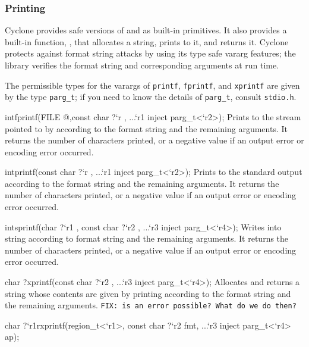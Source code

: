 \subsubsection*{Printing}

Cyclone provides safe versions of  and  as
built-in primitives.  It also provides a built-in function,
, that allocates a string, prints to it, and returns it.
Cyclone protects against format string attacks by using its type safe
vararg features; the library verifies the format string and
corresponding arguments at run time.

The permissible types for the varargs of \texttt{printf},
\texttt{fprintf}, and \texttt{xprintf} are given by the type
\texttt{parg_t}; if you need to know the details of \texttt{parg_t},
consult \texttt{stdio.h}.

\begin{defun2}{int}{fprintf}{(FILE @,const char {?}`r , ...`r1 inject parg_t<`r2>);}
  Prints to the stream pointed to by  according to the format
  string  and the remaining arguments.  It returns the number
  of characters printed, or a negative value if an output error or
  encoding error occurred.
\end{defun2}
\begin{defun2}{int}{printf}{(const char {?}`r , ...`r1 inject parg_t<`r2>);}
  Prints to the standard output according to the format string 
  and the remaining arguments.  It returns the number of characters
  printed, or a negative value if an output error or encoding error
  occurred.
\end{defun2}
\begin{defun2}{int}{sprintf}{(char {?}`r1 , const char {?}`r2 , ...`r3 inject parg_t<`r4>);}
  Writes into string  according to format string  and
  the remaining arguments.  It returns the number of characters
  printed, or a negative value if an output error or encoding error
  occurred.
\end{defun2}
\begin{defun2}{char ?}{xprintf(const char {?}`r2 , ...`r3 inject parg_t<`r4>);}
  Allocates and returns a string whose contents are given by printing
  according to the format string  and the remaining arguments.
  \texttt{FIX: is an error possible?  What do we do then?}
\end{defun2}
\begin{defun2}{char {?}`r1}{rxprintf}{(region_t<`r1>, const char {?}`r2 fmt, ...`r3 inject parg_t<`r4> ap);}
\end{defun2}

